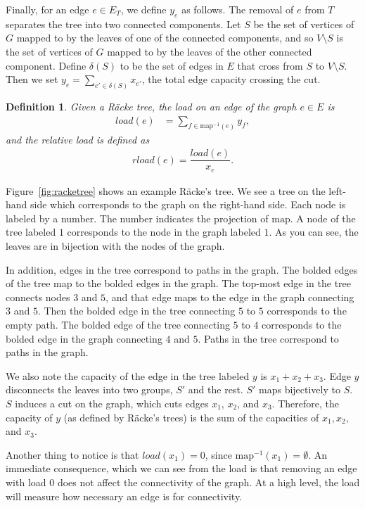 \documentclass[12pt]{article}
\newtheorem{definition}{Definition}
\begin{document}
Finally, for an edge $e \in E_T$, we define $y_e$ as follows. The removal of $e$ from $T$ separates the tree into two connected components. Let $S$ be the set of vertices of $G$ mapped to by the leaves of one of the connected components, and so $V \setminus S$ is the set of vertices of $G$ mapped to by the leaves of the other connected component. Define $\delta(S)$ to be the set of edges in $E$ that cross from $S$ to $V \setminus S$. Then we set $y_e = \sum_{e' \in \delta(S)} x_{e'}$, the total edge capacity crossing the cut.

\begin{definition}
Given a R\"{a}cke tree, the load on an edge of the graph $e \in E$ is
\begin{align}
load(e) &= \sum_{f \in \text{map}^{-1}(e)} y_f,
\end{align}
and the relative load is defined as 
\begin{align}
rload(e) = \dfrac{load(e)}{x_e}.
\end{align}
\end{definition}

Figure~\ref{fig:racketree} shows an example R\"{a}cke's tree. We see a tree on the left-hand side which corresponds to the graph on the right-hand side. Each node is labeled by a number. The number indicates the projection of $\mathrm{map}$. A node of the tree labeled $1$ corresponds to the node in the graph labeled $1$. As you can see, the leaves are in bijection with the nodes of the graph. 

In addition, edges in the tree correspond to paths in the graph. The bolded edges of the tree map to the bolded edges in the graph. The top-most edge in the tree connects nodes $3$ and $5$, and that edge maps to the edge in the graph connecting $3$ and $5$. Then the bolded edge in the tree connecting $5$ to $5$ corresponds to the empty path. The bolded edge of the tree connecting $5$ to $4$ corresponds to the bolded edge in the graph connecting $4$ and $5$. Paths in the tree correspond to paths in the graph. 

We also note the capacity of the edge in the tree labeled $y$ is $x_1 + x_2 + x_3$. Edge $y$ disconnects the leaves into two groups, $S'$ and the rest. $S'$ maps bijectively to $S$. $S$ induces a cut on the graph, which cuts edges $x_1$, $x_2$, and $x_3$. Therefore, the capacity of $y$ (as defined by R\"{a}cke's trees) is the sum of the capacities of $x_1,x_2,$ and $x_3$. 

Another thing to notice is that $load(x_1) = 0$, since $\mathrm{map}^{-1}(x_1) = \emptyset$. An immediate consequence, which we can see from the load is that removing an edge with load 0 does not affect the connectivity of the graph. At a high level, the load will measure how necessary an edge is for connectivity. 
\end{document}
